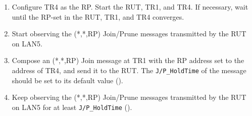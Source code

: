 \documentclass[11pt]{report}
\begin{document}

\begin{enumerate}

  \item Configure TR4 as the RP. Start the RUT, TR1, and TR4. If
  necessary, wait until the RP-set in the RUT, TR1, and TR4
  converges.

  \item Start observing the (*,*,RP) Join/Prune messages transmitted by the
  RUT on LAN5.

  \item Compose an (*,*,RP) Join message at TR1 with the RP address set to the
  address of TR4, and send it to the RUT. 
  The \verb=J/P_HoldTime= of the message should be set to its default
  value ({\PimsmJPHoldTime}).

  \item Keep observing the (*,*,RP) Join/Prune messages transmitted by the
  RUT on LAN5 for at least \verb=J/P_HoldTime= ({\PimsmJPHoldTime}).

\end{enumerate}

\end{document}
